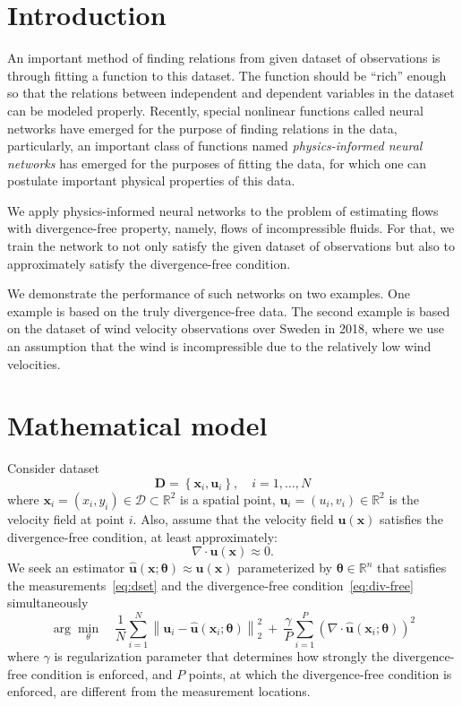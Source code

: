 \documentclass[pamm,a4paper,fleqn]{w-art}
\renewcommand{\vec}[1]{\boldsymbol{#1}}
\newcommand{\R}{\mathbb R}
\newcommand{\norm}[1]{\left\lVert#1\right\rVert}
\begin{document}
\section{Introduction}

An important method of finding relations from given dataset of observations
is through fitting a function to this dataset.
The function should be ``rich'' enough so that the relations between independent
and dependent variables in the dataset can be modeled properly.
Recently, special nonlinear functions called neural networks have emerged for
the purpose of finding relations in the data, particularly, an important class
of functions named \emph{physics-informed neural networks} \cite{RaissiEtAl2019} has emerged for
the purposes of fitting the data, for which one can postulate important physical
properties of this data.

We apply physics-informed neural networks to the problem of estimating flows
with divergence-free property, namely, flows of incompressible fluids.
For that, we train the network to not only satisfy the given dataset of
observations but also to approximately satisfy the divergence-free condition.

We demonstrate the performance of such networks on two examples.
One example is based on the truly divergence-free data.
The second example is based on the dataset of wind velocity observations over
Sweden in 2018, where we use an assumption that the wind is incompressible due
to the relatively low wind velocities.

\section{Mathematical model}
Consider dataset
\begin{equation}
  \label{eq:dset}
  \vec{D} = \left\{\vec{x}_i, \vec{u}_i\right\}, \quad i = 1, \dots, N
\end{equation}
where $\vec{x}_i = (x_i, y_i) \in \mathcal D \subset \R^2$ is a spatial point,
$\vec{u}_i = (u_i, v_i) \in \R^2$ is the velocity field at point $i$.
Also, assume that the velocity field $\vec u (\vec x)$ satisfies the
divergence-free condition, at least approximately:
\begin{equation}
  \label{eq:div-free}
  \nabla \cdot \vec u (\vec x) \approx 0.
\end{equation}
We seek an estimator $\hat{\vec u} (\vec x; \vec \theta)\approx \vec u(\vec x)$
parameterized by $\vec \theta \in \R^n$ that satisfies
the measurements~\eqref{eq:dset} and the divergence-free
condition~\eqref{eq:div-free} simultaneously
\begin{equation}
  \label{eq:opt-problem}
  \arg \min_\theta \quad
  \frac{1}{N} \sum_{i=1}^N \norm{\vec u_i - \hat{\vec u}(\vec x_i; \vec\theta)}^2_2
  \ + \ 
  \frac{\gamma}{P} \sum_{i=1}^P \left( \nabla \cdot \hat{\vec u}(\vec x_i; \vec\theta)\right)^2
\end{equation}
where 
$\gamma$ is regularization parameter that determines how strongly
the divergence-free condition is enforced, 
and $P$ points, at which the divergence-free condition is enforced, are different
from the measurement locations.
\end{document}
